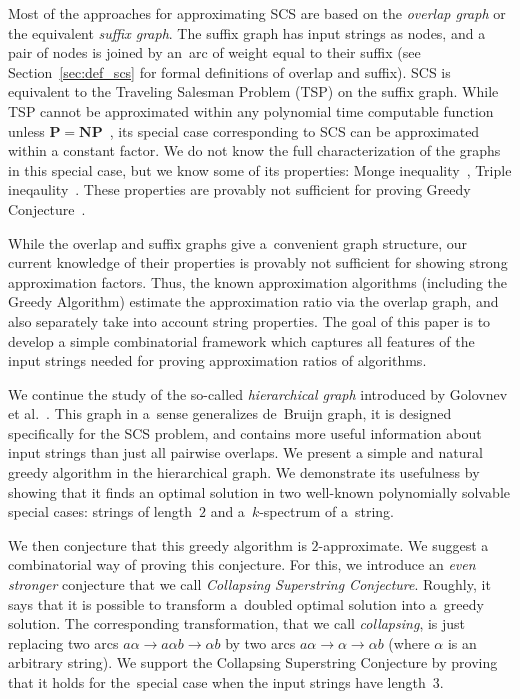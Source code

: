 \documentclass[11pt]{article}
\begin{document}


Most of the approaches for approximating SCS are based on the
{\em overlap graph} or the equivalent \emph{suffix graph}. The suffix graph has input strings as nodes, and a pair of nodes 
is joined by an~arc of weight equal to their suffix (see Section~\ref{sec:def_scs} for formal definitions of overlap and suffix).
SCS is equivalent to the Traveling Salesman Problem (TSP) on the suffix graph. While TSP cannot be approximated within any polynomial time computable function unless $\mathbf{P}=\mathbf{NP}$~\cite{SG1976}, its special case corresponding to SCS can be approximated within a constant factor. We do not know the full characterization of the graphs in this special case, but we know some of its properties: Monge inequality~\cite{monge}, Triple ineqaulity~\cite{weinard2006greedy}. These properties are provably not sufficient for proving Greedy Conjecture~\cite{weinard2006greedy, laube2005conditional}. 

While the overlap and suffix graphs give a~convenient graph structure, our current knowledge of their properties is provably not sufficient for showing strong approximation factors. Thus, the known approximation algorithms (including the Greedy Algorithm) estimate the approximation ratio via the overlap graph, and also separately take into account string properties. The goal of this paper is to develop a simple combinatorial framework which captures all features of the input strings needed for proving approximation ratios of algorithms.

We continue the study of the so-called {\em hierarchical graph}
introduced by Golovnev et al.~\cite{scs_exact}. This graph in a~sense generalizes de~Bruijn graph, it is designed specifically 
for the SCS problem, and contains more useful information about input strings
than just all pairwise overlaps. We present a simple and natural greedy algorithm
in the hierarchical graph. 
We demonstrate its usefulness by showing that it finds an optimal solution 
in two well-known polynomially solvable special cases: strings of length~$2$ and
a~$k$-spectrum of a~string.

We then conjecture that this greedy algorithm is $2$-approximate. We suggest a combinatorial way of proving this conjecture. For this, we introduce an {\em even stronger} conjecture that we call 
{\em Collapsing Superstring Conjecture}. 
Roughly, it says that it is possible to transform a~doubled optimal 
solution into a~greedy solution. 
The corresponding transformation, that we call {\em collapsing}, 
is just replacing two arcs $a\alpha \to a\alpha b \to \alpha b$ 
by two arcs $a\alpha \to \alpha \to \alpha b$ (where $\alpha$ is an arbitrary string). 
We support the Collapsing Superstring Conjecture by 
proving that it holds for the~special case when the input strings have length~3.
\end{document}
